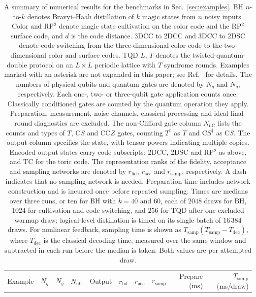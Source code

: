 \begin{table}[t]
\caption{A summary of numerical results for the benchmarks in Sec.~\ref{sec:examples}.
BH $n$-to-$k$ denotes Bravyi--Haah distillation of $k$ magic states from $n$ noisy inputs.
Color and RP$^2$ denote magic state cultivation on the color code and the RP$^2$ surface code,
and $d$ is the code distance.
3DCC to 2DCC and 3DCC to 2DSC denote code switching from the three-dimensional color code
to the two-dimensional color and surface codes.
TQD $L$, $T$ denotes the twisted-quantum-double protocol on an $L\times L$ periodic lattice with $T$ syndrome rounds.
Examples marked with an asterisk are not expanded in this paper; see Ref.~\cite{magna} for details.
The numbers of physical qubits and quantum gates are denoted by $N_q$ and $N_g$, respectively.
Each one-, two- or three-qubit gate application counts once.
Classically conditioned gates are counted by the quantum operation they apply.
Preparation, measurement, noise channels, classical processing and ideal final-round diagnostics are excluded.
The non-Clifford gate column $N_{\text{nC}}$ lists the counts and types of $T$, $\mathrm{C}S$ and $\mathrm{CC}Z$ gates,
counting $T^\dagger$ as $T$ and $\mathrm{C}S^\dagger$ as $\mathrm{C}S$.
The output column specifies the state, with tensor powers indicating multiple copies.
Encoded output states carry code subscripts: 2DCC, 2DSC and RP$^2$ as above, and TC for the toric code.
The representation ranks of the fidelity, acceptance and sampling networks
are denoted by $r_{\text{fid}}$, $r_{\text{acc}}$ and $r_{\text{samp}}$, respectively.
A dash indicates that no sampling network is needed.
Preparation time includes network construction and is incurred once before repeated sampling.
Times are medians over three runs, or ten for BH with $k=40$ and $60$,
each of $2048$ draws for BH, $1024$ for cultivation and code switching, and $256$ for TQD after one excluded warmup draw;
logical-level distillation is timed on its single batch of $16\,384$ draws.
For nonlinear feedback, sampling time is shown as
$T_{\text{samp}}(T_{\text{samp}}-T_{\text{dec}})$, where $T_{\text{dec}}$ is the classical decoding time,
measured over the same window and subtracted in each run before the median is taken.
Both values are per attempted draw.
}
\label{tab:examples-overview}
\begin{ruledtabular}
\footnotesize
\setlength{\tabcolsep}{2pt}
\begin{tabular}{lrrrlrrrrr}
Example & $N_q$ & $N_g$ & $N_{\text{nC}}$ & Output & $r_{\text{fid}}$ & $r_{\text{acc}}$ & $r_{\text{samp}}$ & Prepare (\unit{\milli\second}) & $T_{\text{samp}}$ (\unit{\milli\second}/draw) \\

\end{tabular}
\end{ruledtabular}
\end{table}
